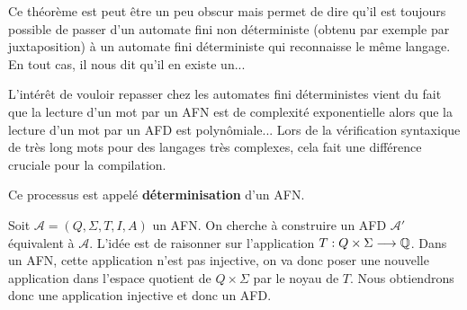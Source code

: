 Ce théorème est peut être un peu obscur mais permet de dire qu'il est toujours possible de passer d'un 
automate fini non déterministe (obtenu par exemple par juxtaposition) à un automate fini déterministe
qui reconnaisse le même langage. En tout cas, il nous dit qu'il en existe un...

\vspace{0.3cm}

L'intérêt de vouloir repasser chez les automates fini déterministes vient du fait que la lecture d'un mot par 
un AFN est de complexité exponentielle alors que la lecture d'un mot par un AFD est polynômiale... 
Lors de la vérification syntaxique de très long mots pour des langages très complexes, cela fait une différence 
cruciale pour la compilation. 

Ce processus est appelé \textbf{déterminisation} d'un AFN. 

\begin{proposition}
    Soit $ \mathcal{A} = (Q, \Sigma, T, I, A)$ un AFN. On cherche à construire un AFD $ \mathcal{A}'$ équivalent à $ \mathcal{A}$. 
    L'idée est de raisonner sur l'application $T : Q \times \Sigma \longrightarrow \mathbb{Q}$. Dans un AFN, cette application 
    n'est pas injective, on va donc poser une nouvelle application dans l'espace quotient de $Q \times \Sigma$ par le noyau de $T$. 
    Nous obtiendrons donc une application injective et donc un AFD. 
\end{proposition}

\newpage 


